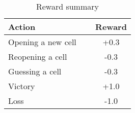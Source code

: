 \begin{table}[h]
  \centering
  \begin{tabular}[t]{| l | c |}
    \hline
    \textbf{Action} & \textbf{Reward}\\
    \hline
    Opening a new cell \ \ & +0.3 \\
    Reopening a cell & -0.3 \\
    Guessing a cell & -0.3 \\
    Victory & +1.0 \\
    Loss & -1.0 \\
    \hline
  \end{tabular}
  \caption{Reward summary}
\end{table}
